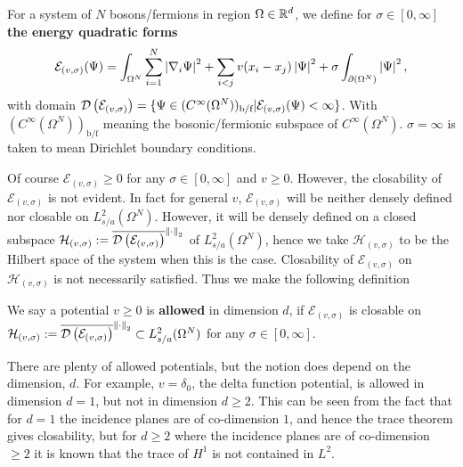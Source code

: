 \begin{definition}
	For a system of $ N $ bosons/fermions in region $ \Omega\in\mathbb{R}^d $, we define for $ \sigma\in[0,\infty] $ \textbf{the energy quadratic forms}
\begin{equation}\label{key}
\mathcal{E}_{(v,\sigma)}(\Psi)=\int_{\Omega^N} \sum_{i=1}^{N}\left\lvert \nabla_i\Psi \right\rvert^2+\sum_{i<j} v(x_i-x_j)\left\lvert \Psi \right\rvert^2+\sigma\int_{\partial (\Omega^N)}\left\lvert \Psi \right\rvert^2,
\end{equation}
with domain $ \mathcal D\left(\mathcal{E}_{(v,\sigma)}\right)=\{\Psi\in (C^\infty(\Omega^N))_{\text{b/f}}\vert \mathcal{E}_{(v,\sigma)}(\Psi)<\infty\} $. With $ (C^\infty(\Omega^N))_{\text{b/f}} $ meaning the bosonic/fermionic subspace of $ C^\infty(\Omega^N) $. $ \sigma=\infty $ is taken to mean Dirichlet boundary conditions.
\end{definition}
Of course $ \mathcal{E}_{(v,\sigma)}\geq 0 $ for any $ \sigma\in[0,\infty] $ and $ v\geq 0 $. However, the closability of $ \mathcal{E}_{(v,\sigma)} $ is not evident. In fact for general $ v $, $ \mathcal{E}_{(v,\sigma)} $ will be neither densely defined nor closable on $ L^2_{s/a}(\Omega^N) $. However, it will be densely defined on a closed subspace $ \mathcal{H}_{(v,\sigma)}:=\overline{\mathcal D\left(\mathcal{E}_{(v,\sigma)}\right)}^{\left\lVert \cdot \right\rVert_2} $ of $ L^2_{s/a}(\Omega^N) $, hence we take $ \mathcal{H}_{(v,\sigma)} $ to be the Hilbert space of the system when this is the case. Closability of $ \mathcal{E}_{(v,\sigma)} $ on $ \mathcal{H}_{(v,\sigma)} $ is not necessarily satisfied. Thus we make the following definition
\begin{definition}
	We say a potential $ v\geq 0 $ is \textbf{allowed} in dimension $ d $, if $ \mathcal{E}_{(v,\sigma)} $ is closable on $ \mathcal{H}_{(v,\sigma)}:=\overline{\mathcal D\left(\mathcal{E}_{(v,\sigma)}\right)}^{\left\lVert \cdot \right\rVert_2}\subset L^2_{s/a}(\Omega^N)$ for any $ \sigma\in[0,\infty] $.
\end{definition}
\begin{remark}
	There are plenty of allowed potentials, but the notion does depend on the dimension, $ d $. For example, $ v=\delta_0 $, \ie the delta function potential, is allowed in dimension $ d=1 $, but not in dimension $ d\geq 2 $. This can be seen from the fact that for $ d=1 $ the incidence planes are of co-dimension $ 1 $, and hence the trace theorem gives closability, but for $ d\geq 2 $ where the incidence planes are of co-dimension $ \geq 2 $ it is known that the trace of $ H^1 $ is not contained in $ L^2 $.
\end{remark}

